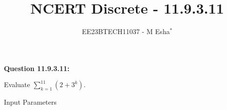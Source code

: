 \documentclass[journal,12pt,twocolumn]{IEEEtran}
\theoremstyle{remark}
\begin{document}

\vspace{3cm}

\title{NCERT Discrete - 11.9.3.11}
\author{EE23BTECH11037 - M Esha$^{*}$}

\maketitle
\newpage
\bigskip

\renewcommand{\thefigure}{\theenumi}
\renewcommand{\thetable}{\theenumi}

\vspace{3cm}
\textbf{Question 11.9.3.11:}

Evaluate $\sum_{k=1}^{11} (2 + 3^k)$.

\solution
\begin{table}[h!]
  \centering
  
  \caption{Input Parameters}
    \label{tab:table1}
\end{table}
\end{document}
